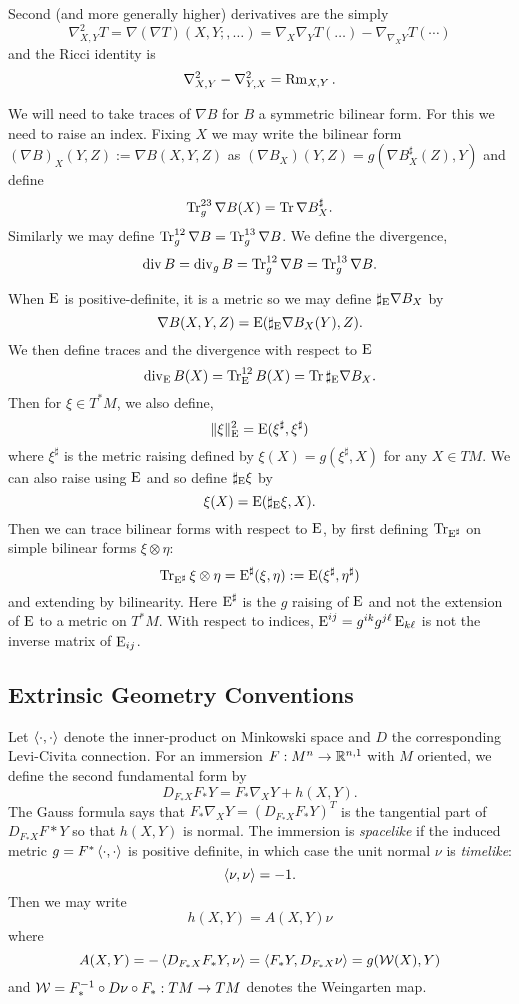 \documentclass[a4paper, 12pt]{amsart}
\begin{document}
Second (and more generally higher) derivatives are the simply
\[
\nabla^2_{X,Y} T = \nabla (\nabla T) (X, Y;, \dots) = \nabla_X \nabla_Y T(\dots) - \nabla_{\nabla_X Y} T (\cdots)
\]
and the Ricci identity is
\[
\nabla^2_{X,Y} - \nabla^2_{Y,X} = \operatorname{Rm}_{X,Y}.
\]

We will need to take traces of \(\nabla B\) for \(B\) a symmetric bilinear form. For this we need to raise an index. Fixing \(X\) we may write the bilinear form \((\nabla B)_X (Y, Z) := \nabla B (X, Y, Z)\) as \((\nabla B_X) (Y, Z) = g(\nabla B^{\sharp}_X (Z), Y)\) and define
\[
\operatorname{Tr}_g^{23} \nabla B (X) = \operatorname{Tr} \nabla B^{\sharp}_X.
\]
Similarly we may define \(\operatorname{Tr}_g^{12} \nabla B = \operatorname{Tr}_g^{13} \nabla B\). We define the divergence,
\[
\operatorname{div} B = \operatorname{div}_g B = \operatorname{Tr}_g^{12} \nabla B = \operatorname{Tr}_g^{13} \nabla B.
\]

When \(\operatorname{E}\) is positive-definite, it is a metric so we may define \(\sharp_{\operatorname{E}} \nabla B_X\) by
\[
\nabla B(X, Y, Z) = \operatorname{E}(\sharp_{\operatorname{E}} \nabla B_X (Y), Z).
\]
We then define traces and the divergence with respect to \(\operatorname{E}\)
\[
\operatorname{div}_{\operatorname{E}} B (X) = \operatorname{Tr}^{12}_{\operatorname{E}} B (X) = \operatorname{Tr} \sharp_{\operatorname{E}} \nabla B_X.
\]
Then for \(\xi \in T^{\ast} M\), we also define,
\[
\|\xi\|_{\operatorname{E}}^2 = \operatorname{E}(\xi^{\sharp}, \xi^{\sharp})
\]
where \(\xi^{\sharp}\) is the metric raising defined by \(\xi(X) = g(\xi^{\sharp}, X)\) for any \(X \in TM\). We can also raise using \(\operatorname{E}\) and so define \(\sharp_{\operatorname{E}} \xi\) by
\[
\xi(X) = \operatorname{E}(\sharp_{\operatorname{E}} \xi, X).
\]
Then we can trace bilinear forms with respect to \(\operatorname{E}\), by first defining \(\operatorname{Tr}_{\operatorname{E}^{\sharp}}\) on simple bilinear forms \(\xi \otimes \eta\):
\[
\operatorname{Tr}_{\operatorname{E}^{\sharp}} \xi \otimes \eta = \operatorname{E}^{\sharp} (\xi, \eta) := \operatorname{E}(\xi^{\sharp}, \eta^{\sharp})
\]
and extending by bilinearity. Here \(\operatorname{E}^{\sharp}\) is the \(g\) raising of \(\operatorname{E}\) and not the extension of \(\operatorname{E}\) to a metric on \(T^{\ast} M\). With respect to indices, \(\operatorname{E}^{ij} = g^{ik}g^{j\ell}\operatorname{E}_{k\ell}\) is not the inverse matrix of \(\operatorname{E}_{ij}\).

\subsection{Extrinsic Geometry Conventions}
\label{subsec:notation_extrinsic}

Let \(\left\langle \cdot,\cdot \right\rangle\) denote the inner-product on Minkowski space and \(D\) the corresponding Levi-Civita connection. For an immersion \(F : M^n \to \mathbb{R}^{n,1}\) with \(M\) oriented, we define the second fundamental form by
\[
D_{F_{\ast} X} F_{\ast} Y = F_{\ast} \nabla_X Y + h(X, Y).
\]
The Gauss formula says that \(F_{\ast} \nabla_X Y = (D_{F_{\ast} X} F_{\ast} Y)^T\) is the tangential part of \(D_{F_{\ast} X} F{\ast} Y\) so that \(h(X, Y)\) is normal. The immersion is \emph{spacelike} if the induced metric \(g = F^{\ast} \left\langle \cdot,\cdot \right\rangle\) is positive definite, in which case the unit normal \(\nu\) is \emph{timelike}:
\[
\left\langle \nu,\nu \right\rangle = -1.
\]
Then we may write
\[
h(X, Y) = A(X, Y) \nu
\]
where
\[
A(X, Y) = -\left\langle D_{F_{\ast} X} F_{\ast} Y,\nu \right\rangle = \left\langle F_{\ast} Y,D_{F_{\ast} X} \nu \right\rangle = g(\operatorname{\mathcal{W}}(X), Y)
\]
and \(\operatorname{\mathcal{W}} = F_{\ast}^{-1} \circ D\nu \circ F_{\ast}: TM \to TM\) denotes the Weingarten map.
\end{document}
